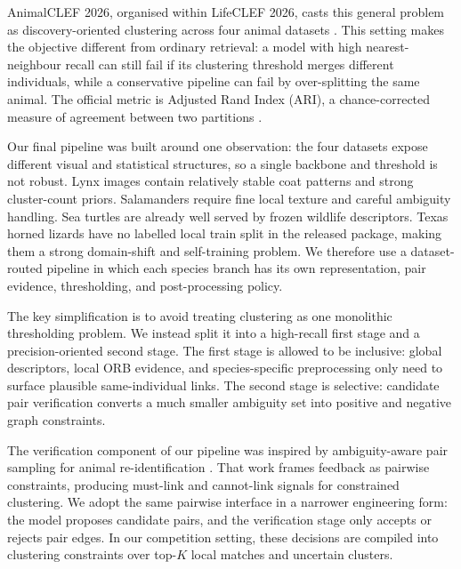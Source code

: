 \documentclass{ceurart}
\begin{document}
AnimalCLEF 2026, organised within LifeCLEF 2026, casts this general problem as discovery-oriented clustering across four animal datasets \cite{lifeclef2026,animalclef2026overview}. This setting makes the objective different from ordinary retrieval: a model with high nearest-neighbour recall can still fail if its clustering threshold merges different individuals, while a conservative pipeline can fail by over-splitting the same animal. The official metric is Adjusted Rand Index (ARI), a chance-corrected measure of agreement between two partitions \cite{hubert1985comparing}.

Our final pipeline was built around one observation: the four datasets expose different visual and statistical structures, so a single backbone and threshold is not robust. Lynx images contain relatively stable coat patterns and strong cluster-count priors. Salamanders require fine local texture and careful ambiguity handling. Sea turtles are already well served by frozen wildlife descriptors. Texas horned lizards have no labelled local train split in the released package, making them a strong domain-shift and self-training problem. We therefore use a dataset-routed pipeline in which each species branch has its own representation, pair evidence, thresholding, and post-processing policy.

The key simplification is to avoid treating clustering as one monolithic thresholding problem. We instead split it into a high-recall first stage and a precision-oriented second stage. The first stage is allowed to be inclusive: global descriptors, local ORB evidence, and species-specific preprocessing only need to surface plausible same-individual links. The second stage is selective: candidate pair verification converts a much smaller ambiguity set into positive and negative graph constraints.

The verification component of our pipeline was inspired by ambiguity-aware pair sampling for animal re-identification \cite{sani2026active}. That work frames feedback as pairwise constraints, producing must-link and cannot-link signals for constrained clustering. We adopt the same pairwise interface in a narrower engineering form: the model proposes candidate pairs, and the verification stage only accepts or rejects pair edges. In our competition setting, these decisions are compiled into clustering constraints over top-$K$ local matches and uncertain clusters.
\end{document}
